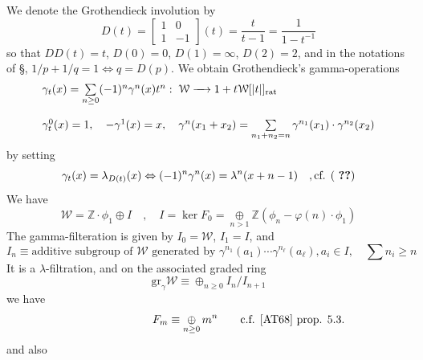 \documentclass[leqno]{article}
\newcommand{\Z}{\mathbb{Z}}
\newcommand{\oplussum}{\mathop{\oplus}}
\numberwithin{equation}{section}
\begin{document}
We denote the Grothendieck involution by
\begin{equation}
  \label{eq:13.42}
  D(t)=\begin{bmatrix} 1 & 0 \\ 1 & -1 \end{bmatrix}(t) = \frac{t}{t-1}= \frac{1}{1-t^{-1}}
\end{equation}
so that $DD(t)=t$, $D(0)=0$, $D(1)=\infty$, $D(2)=2$, and in the notations of \S {}, $1/p+1/q=1 \Leftrightarrow
q=D(p)$. We obtain Grothendieck's gamma-operations
\begin{equation}
  \label{eq:13.43}
  \begin{array}[h]{l}
    \gamma_t(x)=\sum\limits_{n\ge 0} (-1)^n\gamma^n(x)t^n:\; \mathcal{W}\xrightarrow{\quad} 1+t\mathcal{W}[|t|]_{\text{rat}} \\\\
    \gamma_t^0(x)=1,\quad -\gamma^1(x)=x,\quad \gamma^n(x_1+x_2)=\sum\limits_{n_1+n_2=n}\gamma^{n_1}(x_1)\cdot\gamma^{n_2}(x_2)
  \end{array}
\end{equation}
by setting
\begin{equation}
  \label{eq:13.44}
  \gamma_t(x)=\lambda_{D(t)}(x) \Leftrightarrow (-1)^n\gamma^n(x)=\lambda^n(x+n-1)\quad, \text{cf. (~\Ref{eq:13.39})}
  \end{equation}
  We have
  \begin{equation}
    \label{eq:13.45}
    \mathcal{W}=\Z\cdot\phi_1\oplus I \quad ,\quad I=\ker F_0=\oplussum\limits_{n>1}\Z(\phi_n-\varphi(n)\cdot \phi_1)
  \end{equation}
  The gamma-filteration is given by $I_0=\mathcal{W}$, $I_1=I$, and
  \begin{equation}
    \label{eq:13.46}
    I_n\equiv \text{additive subgroup of $\mathcal{W}$ generated by $\gamma^{n_1}(a_1)\cdots \gamma^{n_\ell}(a_\ell), 
      a_i\in I , \quad \sum n_i\ge n$}
  \end{equation}
  It is a $\lambda$-filtration, and on the associated graded ring
  \begin{equation}
    \label{eq:13.47}
    \text{gr}_\gamma\mathcal{W} \equiv \oplussum_{n\ge 0} I_n/I_{n+1}
  \end{equation}
  we have
  \begin{equation}
    \label{eq:13.48}
   \ \hspace{24mm} F_m \equiv \oplussum\limits_{n\ge 0} m^n \qquad \text{c.f. \cite{AT68} prop. 5.3.} 
  \end{equation}
  and also
\end{document}
